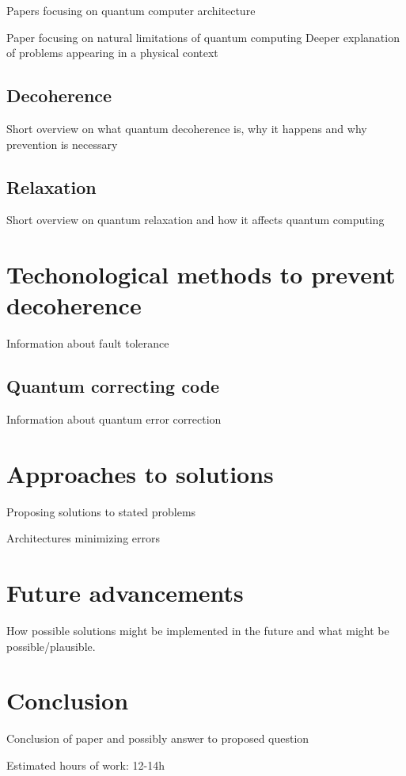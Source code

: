 Papers focusing on quantum computer architecture  \cite{2012PhRvX...2c1007J}

Paper focusing on natural limitations of quantum computing
Deeper explanation of problems appearing in a physical context
\subsection{Decoherence}
Short overview on what quantum decoherence is, why it happens and why prevention is necessary
\subsection{Relaxation}
Short overview on quantum relaxation and how it affects quantum computing

\section{Techonological methods to prevent decoherence}

Information about fault tolerance \cite{2015arXiv150803695P}
\subsection{Quantum correcting code}

Information about quantum error correction \cite{2009arXiv0904.2557G}
\section{Approaches to solutions}
Proposing solutions to stated problems

Architectures minimizing errors \cite{2009arXiv0906.2686V} \cite{2012PhRvX...2c1007J}
\section{Future advancements}
How possible solutions might be implemented in the future and what might be possible/plausible.

\section{Conclusion}
Conclusion of paper and possibly answer to proposed question

Estimated hours of work: 12-14h

\nocite{*}